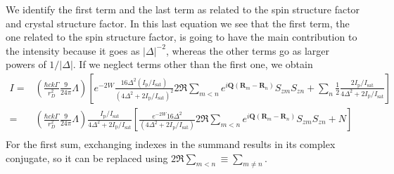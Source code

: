 \documentclass[11pt,letter]{article}
\newcommand{\bv}[1]{\ensuremath{\bm{#1}}}
\newcommand{\iisat}{\ensuremath{I_{\mathrm{p}}/I_{\mathrm{sat}}}}
\begin{document}
We identify the first term and the last term as related to the spin structure
factor and crystal structure factor.
In this last equation we see that the first term, the one related to the spin
structure factor, is going to have the main contribution to the intensity
because it goes as $ |\Delta|^{-2} $, whereas the other terms go as larger
powers of $1/|\Delta|$.  If we neglect terms other than the first one,  we
obtain
\begin{equation}
\begin{split} 
 I  =  & 
 \left( 
 \frac{\hbar c k \Gamma}{r_{D}^{2}}  
     \frac{9}{24\pi} \Lambda 
  \right) \left[
     e^{-2W}
      \frac{ 16 \Delta^{2} (\iisat)  } 
           {(4 \Delta^{2} + 2 \iisat)^{2} }  
       2 \Re \sum_{m<n}  
      e^{ i \bv{Q}( \bv{R}_{m} - \bv{R}_{n} ) } 
      S_{zm}S_{zn}
  + \sum_{n}  \frac{1}{2} \frac{2 \iisat }{ 4 \Delta^{2} + 2 \iisat }
\right]  \\ 
 =  & \left( 
 \frac{\hbar c k \Gamma}{r_{D}^{2}}  
     \frac{9}{24\pi} \Lambda 
  \right) 
  \frac{ \iisat }{ 4 \Delta^{2} + 2 \iisat }
  \left[
      \frac{ e^{-2W}16 \Delta^{2}  } 
           {(4 \Delta^{2} + 2 \iisat) }  
       2 \Re \sum_{m<n}  
      e^{ i \bv{Q}( \bv{R}_{m} - \bv{R}_{n} ) } 
      S_{zm}S_{zn}
  + N 
\right]  \\ 
\end{split}
\end{equation}
For the first sum, exchanging indexes in the summand results in its complex
conjugate, so it can be replaced using $2\Re\sum_{m<n} \equiv \sum_{m\neq n}$.
\end{document}
